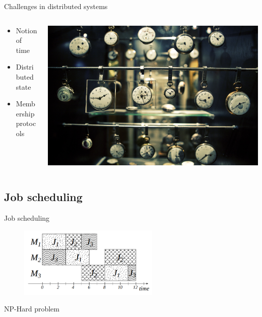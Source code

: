 \documentclass[10pt]{beamer}
\begin{document}
\begin{frame}[fragile]{Challenges in distributed systems}
  \begin{columns}[T]
    \begin{column}{.4\textwidth}
      \begin{block}{}
        \begin{itemize}
        \item Notion of time
        \item Distributed state
        \item Membership protocols
        \end{itemize}
      \end{block}
    \end{column}
    \begin{column}{.6\textwidth}
      \begin{block}{}
        \includegraphics[width=1\textwidth]{../figures/clocks.jpg}
      \end{block}
    \end{column}
  \end{columns}
\end{frame}

\subsection{Job scheduling}

\begin{frame}{Job scheduling}
  \begin{figure}[!h]
    \centering
    \includegraphics[width=0.6\textwidth]{../figures/jssp.png}
    \label{fig:jssp}
  \end{figure}
  NP-Hard problem
\end{frame}
\end{document}

